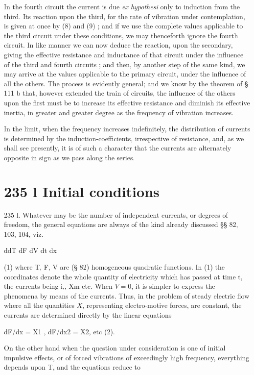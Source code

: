 In the fourth circuit the current is due \textit{ex hypothesi} only to induction from
the third. Its reaction upon the third, for the rate of vibration under
contemplation, is given at once by (8) and (9) ; and if we use the complete
values applicable to the third circuit under these conditions, we may
thenceforth ignore the fourth circuit. In like manner we can now deduce the
reaction, upon the secondary, giving the effective resistance and inductance of
that circuit under the influence of the third and fourth circuits ; and then,
by another step of the same kind, we may arrive at the values applicable to the
primary circuit, under the influence of all the others. The process is
evidently general; and we know by the theorem of § 111 b that, however extended
the train of circuits, the influence of the others upon the first must be to
increase its effective resistance and diminish its effective inertia, in
greater and greater degree as the frequency of vibration increases.

In the limit, when the frequency increases indefinitely, the distribution of
currents is determined by the induction-coefficients, irrespective of
resistance, and, as we shall see presently, it is of such a character that the
currents are alternately opposite in sign as we pass along the series.

\section{235 l Initial conditions}
235 l. Whatever may be the number of independent currents, or degrees of
freedom, the general equations are always of the kind already discussed §§ 82,
103, 104, viz.

ddT dF dV dt dx

 (1) where T, F, V are (§ 82) homogeneous quadratic functions. In (1)
the coordinates denote the whole quantity of electricity
which has passed at time t, the currents being
i,, Xm etc.
When \(V =0\), it is simpler to express the phenomena by means of the currents.
Thus, in the problem of steady electric flow where all the quantities \(X\),
representing electro-motive forces, are constant, the currents are determined
directly by the linear equations

dF/dx = X1 , dF/dx2 = X2,  etc (2).

On the other hand when the question under consideration is one of initial
impulsive effects, or of forced vibrations of exceedingly high frequency,
everything depends upon T, and the equations reduce to

